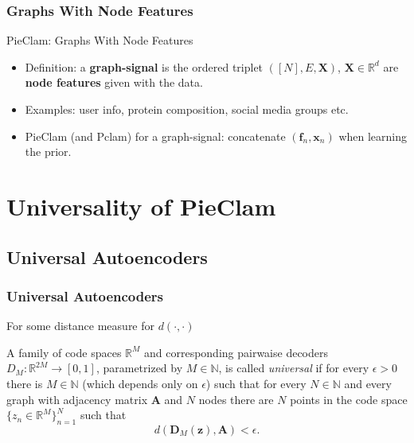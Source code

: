 \documentclass{beamer}
\begin{document}
\subsubsection{Graphs With Node Features}
\begin{frame}{PieClam: Graphs With Node Features}
    \begin{itemize}[itemsep=1em, label=\textbullet]
        \item Definition: a \textbf{graph-signal} is the ordered triplet $([N], E, \mathbf{X})$, $\mathbf{X} \in \mathbb{R}^d$ are \textbf{node features} given with the data.%
        \item Examples: user info, protein composition, social media groups etc.%
        \item PieClam (and Pclam) for a graph-signal: concatenate $(\mathbf{f}_n, \mathbf{x}_n)$ when learning the prior.%
    \end{itemize}    
\end{frame}




\section{Universality of PieClam}

\subsection{Universal Autoencoders}

\begin{frame}
\frametitle{Universal Autoencoders}
For some distance measure for $d(\cdot, \cdot)$
\begin{definition}    
    A family of code spaces $\mathbb{R}^M$ and corresponding pairwaise decoders $D_M:\mathbb{R}^{2M}\rightarrow[0,1]$, parametrized by $M\in\mathbb{N}$, is called  \emph{universal} if for every $\epsilon>0$ there is $M\in\mathbb{N}$ (which depends only on $\epsilon$) such that for every $N\in\mathbb{N}$ and every graph  with adjacency matrix $\mathbf{A}$ and $N$ nodes there are $N$ points in the code space $\{z_n\in\mathbb{R}^M\}_{n=1}^N$ such that 
     \[d(\mathbf{D}_M(\mathbf{z}), \mathbf{A}) <\epsilon.\] 
\end{definition}
\end{frame}
\end{document}
